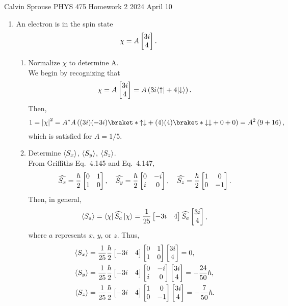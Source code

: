 \documentclass[a4paper, 12pt]{config/homework}
\begin{document}
\noindent
\hfill Calvin Sprouse \hfill PHYS 475 Homework 2 \hfill 2024 April 10 \hfill
\bigskip

\begin{enumerate}
\item An electron is in the spin state
\[\chi = A \left[ \begin{matrix} 3i \\ 4 \end{matrix} \right].\]
\begin{enumerate}
\item Normalize \(\chi\) to determine A.
\bigskip \\
We begin by recognizing that
\[\chi = A \matr{3i \\ 4} = A\left(3i\bra*{\uparrow} + 4\ket*{\downarrow}\right).\]
Then,
\[ 1 = \left| \chi \right|^2
= A^*A \left((3i)(-3i)\braket*{\uparrow}{\downarrow} + (4)(4)\braket*{\downarrow}{\downarrow} + 0 + 0\right)
= A^2 \left(9 + 16\right), \]
which is satisfied for \(A = 1/5\).

\bigskip
\item Determine \(\left\langle S_x \right\rangle\), \(\left\langle S_y \right\rangle\), \(\left\langle S_z \right\rangle\).
\bigskip \\
From Griffiths Eq.\ 4.145 and Eq.\ 4.147,
\[
\widehat{S_x} = \frac{\hbar}{2}\left[ \begin{matrix} 0 & 1 \\ 1 & 0 \end{matrix} \right], \quad
\widehat{S_y} = \frac{\hbar}{2}\left[ \begin{matrix} 0 & -i \\ i & 0 \end{matrix} \right], \quad
\widehat{S_z} = \frac{\hbar}{2}\left[ \begin{matrix} 1 & 0 \\ 0 & -1 \end{matrix} \right].
\]
Then, in general,
\[
\expval{S_a}
= \bra*{\chi}\,\widehat{S_a}\,\ket*{\chi}
= \frac{1}{25}\matr{-3i & 4} \widehat{S_a} \matr{3i \\ 4},
\]
where \(a\) represents \(x\), \(y\), or \(z\).
Thus,
\begin{align*}
\left\langle S_x \right\rangle &= \frac{1}{25}\frac{\hbar}{2}\left[ \begin{matrix} -3i & 4 \end{matrix} \right]\left[ \begin{matrix} 0 & 1 \\ 1 & 0 \end{matrix} \right]\left[ \begin{matrix} 3i \\ 4 \end{matrix} \right] = 0,
\\ \left\langle S_y \right\rangle &= \frac{1}{25}\frac{\hbar}{2}\left[ \begin{matrix} -3i & 4 \end{matrix} \right]\left[ \begin{matrix} 0 & -i \\ i & 0 \end{matrix} \right]\left[ \begin{matrix} 3i \\ 4 \end{matrix} \right] = -\frac{24}{50}\hbar,
\\ \left\langle S_z \right\rangle &= \frac{1}{25}\frac{\hbar}{2}\left[ \begin{matrix} -3i & 4 \end{matrix} \right]\left[ \begin{matrix} 1 & 0 \\ 0 & -1 \end{matrix} \right]\left[ \begin{matrix} 3i \\ 4 \end{matrix} \right] = -\frac{7}{50}\hbar.
\end{align*}


\end{enumerate}
\end{enumerate}
\end{document}
